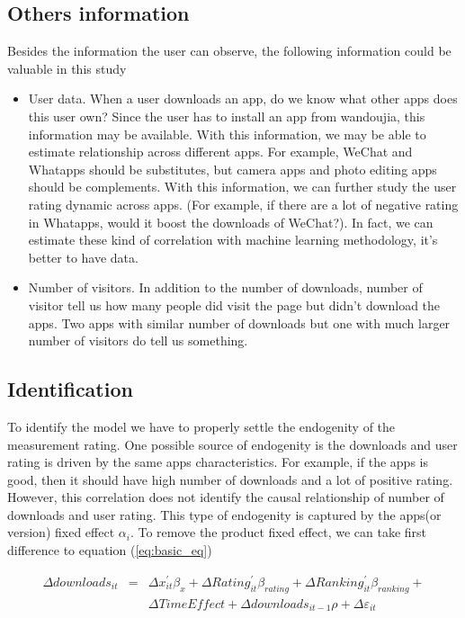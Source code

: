 \documentclass[11pt,twoside]{article}
\begin{document}
\subsection{Others information}
	Besides the information the user can observe, the following information could be valuable in this study
\begin{itemize}
	\item User data. When a user downloads an app, do we know what other apps does this user own? Since the user has to install an app from wandoujia, this information may be available. With this information, we may be able to estimate relationship across different apps. For example, WeChat and Whatapps should be substitutes, but camera apps and photo editing apps should be complements. With this information, we can further study the user rating dynamic across apps. (For example, if there are a lot of negative rating in Whatapps, would it boost the downloads of WeChat?). In fact, we can estimate these kind of correlation with machine learning methodology, it's better to have data.   
	\item Number of visitors. In addition to the number of downloads, number of visitor tell us how many people did visit the page but didn't download the apps. Two apps with similar number of downloads but one with much larger number of visitors do tell us something. 
\end{itemize} 

\subsection{Identification}
	To identify the model we have to properly settle the endogenity of the measurement rating. One possible source of endogenity is the downloads and user rating is driven by the same apps characteristics. For example, if the apps is good, then it should have high number of downloads and a lot of positive rating. However, this correlation does not identify the  causal relationship of number of downloads and user rating. This type of endogenity is captured by the apps(or version) fixed effect $\alpha_i$. To remove the product fixed effect, we can take first difference to equation (\ref{eq:basic_eq})
	
\begin{eqnarray} \label{eq:diff_equation}
	\Delta downloads_{it} &=& \Delta x_{it}^{'} \beta_{x} + \Delta Rating_{it}^{'} \beta_{rating} + \Delta Ranking_{it}^{'} \beta_{ranking} + \\
	&& \Delta TimeEffect +  \Delta downloads_{it-1} \rho + \Delta \varepsilon_{it}
\end{eqnarray}
	
\end{document}
